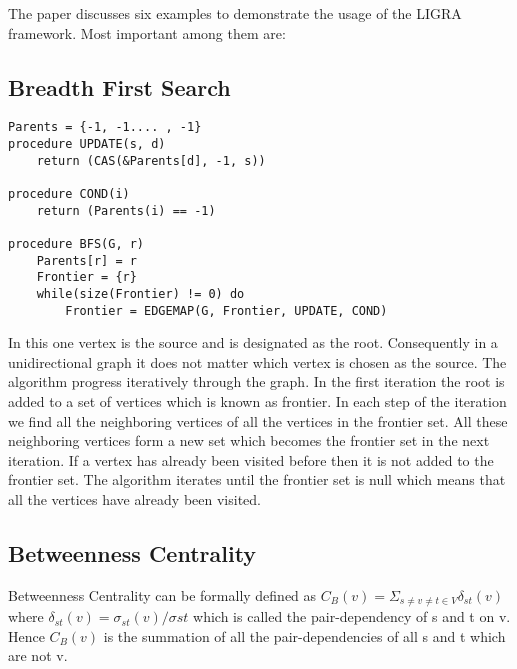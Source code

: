 \documentclass[a4paper,10pt,twoside]{article}
\begin{document}
The paper discusses six examples to demonstrate the usage of the LIGRA framework. Most important among them are:
\subsection{Breadth First Search}
\begin{lstlisting}Parents = {-1, -1.... , -1}
procedure UPDATE(s, d)
	return (CAS(&Parents[d], -1, s))

procedure COND(i)
	return (Parents(i) == -1)

procedure BFS(G, r)
	Parents[r] = r
	Frontier = {r}
	while(size(Frontier) != 0) do
		Frontier = EDGEMAP(G, Frontier, UPDATE, COND)
\end{lstlisting}

In this one vertex is the source and is designated as the root. Consequently in a unidirectional graph it does not matter which vertex is chosen as the source. The algorithm progress iteratively through the graph. In the first iteration the root is added to a set of vertices which is known as frontier. In each step of the iteration we find all the neighboring vertices of all the vertices in the frontier set. All these neighboring vertices form a new set which becomes the frontier set in the next iteration. If a vertex has already been visited before then it is not added to the frontier set. The algorithm iterates until the frontier set is null which means that all the vertices have already been visited.


\subsection{Betweenness Centrality}
Betweenness Centrality can be formally defined as
$C_{B}(v) = \Sigma _{ s \neq v \neq t \in V } \delta _{st} (v)$
where $ \delta _{st} (v) = \sigma_{st}(v)/\sigma{st} $ which is called the pair-dependency of s and t on v.
Hence $C_{B}(v)$ is the summation of all the pair-dependencies of all s and t which are not v.
\end{document}
